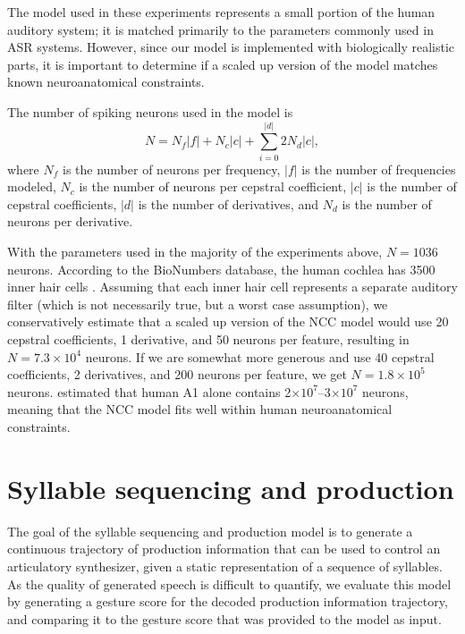The model used in these experiments
represents a small portion
of the human auditory system;
it is matched primarily to the parameters
commonly used in ASR systems.
However, since our model is
implemented with biologically realistic parts,
it is important to determine
if a scaled up version of the model
matches known neuroanatomical constraints.

The number of spiking neurons used
in the model is
\begin{equation}
  N = N_f |f| + N_c |c| + \sum_{i=0}^{|d|} 2 N_d |c|,
\end{equation}
where $N_f$ is the number of neurons per frequency,
$|f|$ is the number of frequencies modeled,
$N_c$ is the number of neurons per cepstral coefficient,
$|c|$ is the number of cepstral coefficients,
$|d|$ is the number of derivatives,
and $N_d$ is the number of neurons per derivative.

With the parameters used
in the majority of the experiments above,
$N=1036$ neurons.
According to the BioNumbers database,
the human cochlea has 3500 inner hair cells
\citep[BNID~100697]{milo2010}.
Assuming that each inner hair cell
represents a separate auditory filter
(which is not necessarily true,
but a worst case assumption),
we conservatively estimate
that a scaled up version
of the NCC model
would use 20 cepstral coefficients,
1 derivative, and 50 neurons per feature,
resulting in $N=7.3 \times 10^4$ neurons.
If we are somewhat more generous
and use 40 cepstral coefficients,
2 derivatives, and 200 neurons per feature,
we get $N=1.8 \times 10^5$ neurons.
\citet{smiley2013} estimated
that human A1 alone contains
2$\times 10^7$--3$\times 10^7$ neurons,
meaning that the NCC model
fits well within human neuroanatomical constraints.

\section{Syllable sequencing and production}
\label{sec:results-production}

The goal of the syllable sequencing and production model
is to generate a continuous trajectory
of production information
that can be used to control
an articulatory synthesizer,
given a static representation
of a sequence of syllables.
As the quality of generated speech
is difficult to quantify,
we evaluate this model
by generating a gesture score
for the decoded production information trajectory,
and comparing it
to the gesture score that was provided
to the model as input.

